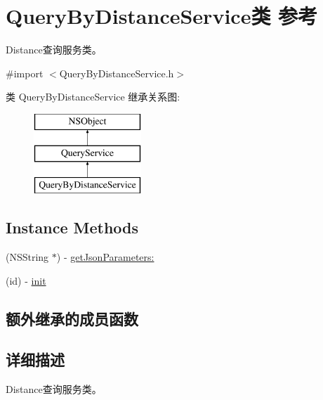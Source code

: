 \hypertarget{interface_query_by_distance_service}{\section{Query\-By\-Distance\-Service类 参考}
\label{interface_query_by_distance_service}
}


Distance查询服务类。  




{\ttfamily \#import $<$Query\-By\-Distance\-Service.\-h$>$}

类 Query\-By\-Distance\-Service 继承关系图\-:\begin{figure}[H]
\begin{center}
\leavevmode
\includegraphics[height=3.000000cm]{interface_query_by_distance_service}
\end{center}
\end{figure}
\subsection*{Instance Methods}
\begin{DoxyCompactItemize}
\item 
(N\-S\-String $\ast$) -\/ \hyperlink{interface_query_by_distance_service_af4ca093849e99a0eba9c78f5ea1f0ae5}{get\-Json\-Parameters\-:}
\item 
(id) -\/ \hyperlink{interface_query_by_distance_service_a2ffafeb5945e78ba50d4a9276d453948}{init}
\end{DoxyCompactItemize}
\subsection*{额外继承的成员函数}


\subsection{详细描述}
Distance查询服务类。 

